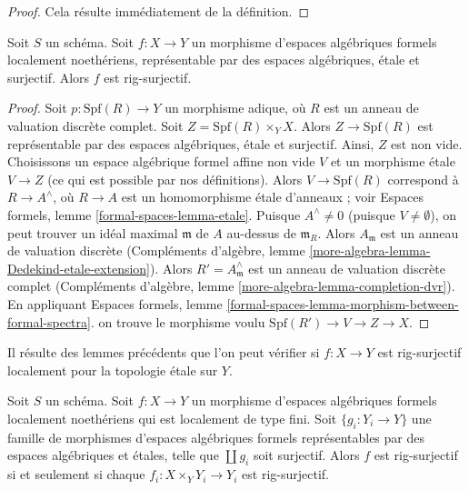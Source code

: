 \begin{proof}
Cela résulte immédiatement de la définition.
\end{proof}

\begin{lemma}
\label{lemma-etale-covering-rig-surjective}
Soit $S$ un schéma. Soit $f : X \to Y$ un morphisme d'espaces algébriques
formels localement noethériens, représentable par des espaces algébriques, étale
et surjectif. Alors $f$ est rig-surjectif.
\end{lemma}

\begin{proof}
Soit $p : \text{Spf}(R) \to Y$ un morphisme adique, où $R$ est un anneau
de valuation discrète complet. Soit $Z = \text{Spf}(R) \times_Y X$. Alors
$Z \to \text{Spf}(R)$ est représentable par des espaces algébriques, étale et
surjectif. Ainsi, $Z$ est non vide. Choisissons un espace algébrique formel affine
non vide $V$ et un morphisme étale $V \to Z$ (ce qui est possible par nos définitions).
Alors $V \to \text{Spf}(R)$ correspond à $R \to A^\wedge$, où
$R \to A$ est un homomorphisme étale d'anneaux ; voir Espaces formels, lemme
\ref{formal-spaces-lemma-etale}. Puisque $A^\wedge \not = 0$
(puisque $V \not = \emptyset$), on peut trouver un idéal maximal $\mathfrak m$
de $A$ au-dessus de $\mathfrak m_R$. Alors $A_\mathfrak m$ est un anneau
de valuation discrète (Compléments d'algèbre, lemme
\ref{more-algebra-lemma-Dedekind-etale-extension}).
Alors $R' = A_\mathfrak m^\wedge$ est un anneau de valuation discrète complet
(Compléments d'algèbre, lemme \ref{more-algebra-lemma-completion-dvr}).
En appliquant Espaces formels, lemme
\ref{formal-spaces-lemma-morphism-between-formal-spectra}.
on trouve le morphisme voulu $\text{Spf}(R') \to V \to Z \to X$.
\end{proof}

\noindent
Il résulte des lemmes précédents que l'on peut vérifier si
$f : X \to Y$ est rig-surjectif localement pour la topologie étale sur $Y$.

\begin{lemma}
\label{lemma-upshot}
Soit $S$ un schéma. Soit $f : X \to Y$ un morphisme d'espaces algébriques
formels localement noethériens qui est localement de type fini.
Soit $\{g_i : Y_i \to Y\}$ une famille de morphismes d'espaces algébriques
formels représentables par des espaces algébriques et
étales, telle que $\coprod g_i$ soit surjectif.
Alors $f$ est rig-surjectif si et seulement si chaque
$f_i : X \times_Y Y_i \to Y_i$ est rig-surjectif.
\end{lemma}

